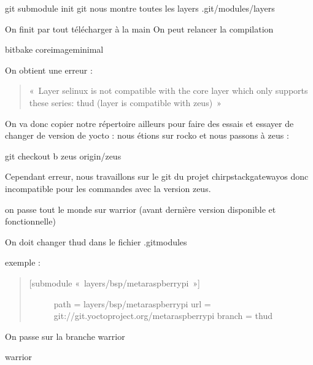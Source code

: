 \documentclass[letterpaper,10pt,french]{sphinxmanual}
\begin{document}
\begin{sphinxVerbatim}[commandchars=\\\{\}]
git submodule init
git  \PYGZgt{} nous montre toutes les layers .git/modules/layers
\end{sphinxVerbatim}

On finit par tout télécharger à la main
On peut relancer la compilation

\begin{sphinxVerbatim}[commandchars=\\\{\}]
bitbake core\PYGZhy{}image\PYGZhy{}minimal
\end{sphinxVerbatim}

On obtient une erreur :
\begin{quote}

« Layer selinux is not compatible with the core layer which only supports these series: thud (layer is compatible with zeus) »
\end{quote}

On va donc copier notre répertoire ailleurs pour faire des essais et essayer de changer de version de yocto : nous étions sur rocko et nous passons à zeus :

\begin{sphinxVerbatim}[commandchars=\\\{\}]
git checkout \PYGZhy{}b zeus origin/zeus
\end{sphinxVerbatim}

Cependant erreur, nous travaillons sur le git du projet chirpstack\sphinxhyphen{}gateway\sphinxhyphen{}os donc incompatible pour les commandes avec la version zeus.

on passe tout le monde sur warrior (avant dernière version disponible et fonctionnelle)

On doit changer thud dans le fichier .gitmodules

exemple :
\begin{quote}
\begin{description}
\item[{{[}submodule « layers/bsp/meta\sphinxhyphen{}raspberrypi »{]}}] \leavevmode
path = layers/bsp/meta\sphinxhyphen{}raspberrypi
url = git://git.yoctoproject.org/meta\sphinxhyphen{}raspberrypi
branch = thud

\end{description}
\end{quote}

On passe sur la branche warrior

\begin{sphinxVerbatim}[commandchars=\\\{\}]
  warrior
\end{sphinxVerbatim}
\end{document}
